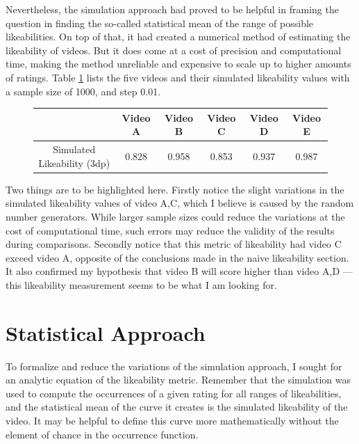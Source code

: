 \documentclass[a4paper,11pt]{article}
\begin{document}
Nevertheless, the simulation approach had proved to be helpful in framing the question in finding the so-called statistical mean of the range of possible likeabilities. On top of that, it had created a numerical method of estimating the likeability of videos. But it does come at a cost of precision and computational time, making the method unreliable and expensive to scale up to higher amounts of ratings. Table \ref{tbl:simulation} lists the five videos and their simulated likeability values with a sample size of 1000, and step 0.01.

\begin{figure}[H]
    \centering
    \begin{tabular}{c|c|c|c|c|c}
        & Video A & Video B & Video C & Video D & Video E \\
        \hline
        \hline
        Simulated Likeability (3dp) & 0.828 & 0.958 &  0.853 & 0.937 & 0.987
    \end{tabular}
    \label{tbl:simulation}
\end{figure}

Two things are to be highlighted here. Firstly notice the slight variations in the simulated likeability values of video A,C, which I believe is caused by the random number generators. While larger sample sizes could reduce the variations at the cost of computational time, such errors may reduce the validity of the results during comparisons. Secondly notice that this metric of likeability had video C exceed video A, opposite of the conclusions made in the naive likeability section. It also confirmed my hypothesis that video B will score higher than video A,D --- this likeability measurement seems to be what I am looking for.

\section{Statistical Approach}

To formalize and reduce the variations of the simulation approach, I sought for an analytic equation of the likeability metric. Remember that the simulation was used to compute the occurrences of a given rating for all ranges of likeabilities, and the statistical mean of the curve it creates is the simulated likeability of the video. It may be helpful to define this curve more mathematically without the element of chance in the occurrence function.

\end{document}
